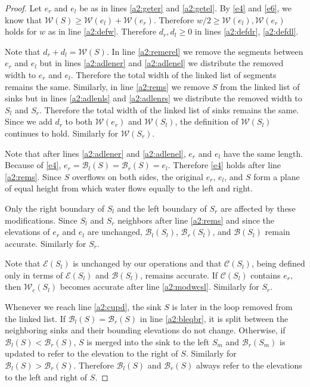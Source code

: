 \documentclass[11pt,a4paper]{article}
\begin{document}
\begin{proof}
Let $e_r$ and $e_l$ be as in lines \ref{a2:geter} and \ref{a2:getel}.
By \ref{e4} and \ref{e6}, we know that $\mathcal{W}(S) \ge \mathcal{W}(e_l) + \mathcal{W}(e_r)$.
Therefore $w/2 \ge \mathcal{W}(e_l), \mathcal{W}(e_r)$ holds for $w$ as in line \ref{a2:defw}.
Therefore $d_r, d_l \ge 0$ in lines \ref{a2:defdr}, \ref{a2:defdl}.

Note that $d_r + d_l = \mathcal{W}(S)$.
In line \ref{a2:remerel} we remove the segments between $e_r$ and $e_l$ but in lines \ref{a2:adlener} and \ref{a2:adlenel} we distribute the removed width to $e_r$ and $e_l$.
Therefore the total width of the linked list of segments remains the same.
Similarly, in line \ref{a2:rems} we remove $S$ from the linked list of sinks but in lines \ref{a2:adlenls} and \ref{a2:adlenrs} we distribute the removed width to $S_l$ and $S_r$.
Therefore the total width of the linked list of sinks remains the same.
Since we add $d_r$ to both $\mathcal{W}(e_r)$ and $\mathcal{W}(S_l)$, the definition of $\mathcal{W}(S_l)$ continues to hold.
Similarly for $\mathcal{W}(S_r)$.

Note that after lines \ref{a2:adlener} and \ref{a2:adlenel}, $e_r$ and $e_l$ have the same length.
Because of \ref{e4}, $e_r = \mathcal{B}_l(S) = \mathcal{B}_r(S) = e_l$.
Therefore \ref{e4} holds after line \ref{a2:rems}.
Since $S$ overflows on both sides, the original $e_r$, $e_l$, and $S$ form a plane of equal height from which water flows equally to the left and right.

Only the right boundary of $S_l$ and the left boundary of $S_r$ are affected by these modifications.
Since $S_l$ and $S_r$ neighbors after line \ref{a2:rems} and since the elevations of $e_r$ and $e_l$ are unchanged, $\mathcal{B}_l(S_l)$, $\mathcal{B}_r(S_l)$, and $\mathcal{B}(S_l)$ remain accurate.
Similarly for $S_r$.

Note that $\mathcal{E}(S_l)$ is unchanged by our operations and that $\mathcal{C}(S_l)$, being defined only in terms of $\mathcal{E}(S_l)$ and $\mathcal{B}(S_l)$, remains accurate.
If $\mathcal{C}(S_l)$ contains $e_r$, then $\mathcal{W}_c(S_l)$ becomes accurate after line \ref{a2:modwcsl}.
Similarly for $S_r$.

Whenever we reach line \ref{a2:cupd}, the sink $S$ is later in the loop removed from the linked list.
If $\mathcal{B}_l(S) = \mathcal{B}_r(S)$ in line \ref{a2:bleqbr}, it is split between the neighboring sinks and their bounding elevations do not change.
Otherwise, if $\mathcal{B}_l(S) < \mathcal{B}_r(S)$, $S$ is merged into the sink to the left $S_m$ and $\mathcal{B}_r(S_m)$ is updated to refer to the elevation to the right of $S$.
Similarly for $\mathcal{B}_l(S) > \mathcal{B}_r(S)$.
Therefore $\mathcal{B}_l(S)$ and $\mathcal{B}_r(S)$ always refer to the elevations to the left and right of $S$.

\end{proof}
\end{document}
